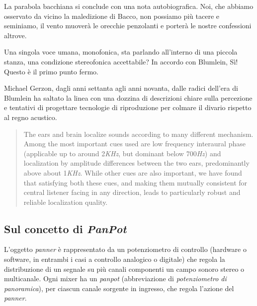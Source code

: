La parabola bacchiana si conclude con una nota autobiografica. Noi, che abbiamo
osservato da vicino la maledizione di Bacco, non possiamo più tacere e seminiamo,
il vento muoverà le orecchie penzolanti e porterà le nostre confessioni altrove.

Una singola voce umana, monofonica, sta parlando all'interno di una piccola
stanza, una condizione stereofonica accettabile? In accordo con Blumlein,
Sì! Questo è il primo punto fermo.

Michael Gerzon, dagli anni settanta agli anni novanta, dalle radici dell'era di
Blumlein ha saltato la linea con una dozzina di descrizioni chiare sulla
percezione e tentativi di progettare tecnologie di riproduzione per colmare il
divario rispetto al regno acustico.

\begin{quotation}
The ears and brain localize sounds according to many different mechanism. Among
the most important cues used are low frequency interaural phase (applicable up
to around 2\emph{KHz}, but dominant below 700\emph{Hz}) and localization by
amplitude differences between the two ears, predominantly above about
1\emph{KHz}. While other cues are also important, we have found that satisfying
both these cues, and making them mutually consistent for central listener facing
in any direction, leads to particularly robust and reliable localization
quality.\cite{mg92pdmsss}
\end{quotation}

\subsection{Sul concetto di \emph{PanPot}}
\label{sec:panpot}

L'oggetto \emph{panner} è rappresentato da un potenziometro di controllo
(hardware o software, in entrambi i casi a controllo analogico o digitale) che
regola la distribuzione di un segnale su più canali componenti un campo sonoro
stereo o multicanale. Ogni mixer ha un \emph{panpot} (abbreviazione di
\emph{potenziometro di panoramica}), per ciascun canale sorgente in ingresso,
che regola l'azione del \emph{panner}.


